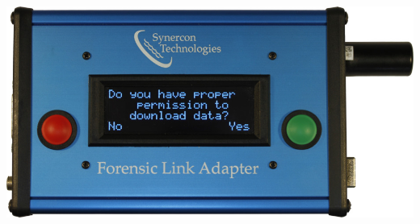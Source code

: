 \documentclass[11pt, oneside]{book}
\begin{document}
\begin{minipage}{0.45\textwidth}
\includegraphics[width=\linewidth]{../media/fla_screens/ethernet_and_others/veh_scan/permission}
\end{minipage}
\\[\baselineskip]
\end{document}
